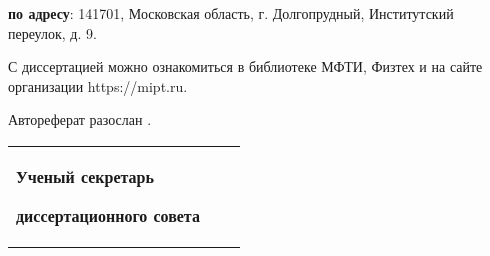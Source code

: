 \textbf{по адресу}: 141701, Московская область, г. Долгопрудный, Институтский
переулок, д. 9.


\vspace{0.008\paperheight plus1fill}
С диссертацией можно ознакомиться в библиотеке МФТИ, Физтех и на сайте организации https://mipt.ru.

\vspace{0.008\paperheight plus1fill}
{Автореферат разослан \synopsisDate.}

\vspace{0.008\paperheight plus1fill}
\noindent%
\begin{tabularx}{\textwidth}{@{}%
>{\raggedright\arraybackslash}b{18em}@{}
>{\centering\arraybackslash}X
r
@{}}
    \textbf{Ученый секретарь}\par
    \textbf{диссертационного совета}
    &
    &
    \textbf{}
\end{tabularx}
